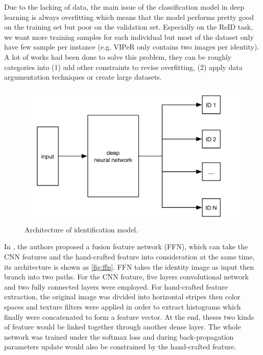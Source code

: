 Due to the lacking of data, the main issue of the classification model in deep
learning is always overfitting which means that the model performs pretty good on the
training set but poor on the validation set. Especially on the ReID task, we want more
training samples for each individual but most of the dataset only have few sample
per instance (e.g. VIPeR only contains two images per identity). A lot of works had
been done to solve this problem, they can be roughly categories into
(1) add other constraints to revise overfitting,
(2) apply data argumentation techniques or create large datasets.

\begin{figure}
    \begin{center}
    \includegraphics[scale=0.8]{figures/id_model.png}
    \end{center}
    \caption{Architecture of identification model.}
    \label{fig:id-model}
\end{figure}

In \cite{feature-fusion-net-2016}, the authors proposed a fusion feature
network (FFN), which can take the CNN features and the hand-crafted feature into
consideration at the same time, its architecture is shown as
\autoref{fig:ffn}. FFN takes the identity image as input then branch into two
paths. For the CNN feature, five layers convolutional network and two fully connected layers
were employed. For hand-crafted feature extraction, the original image was divided into horizontal
stripes then color spaces and texture filters were applied in order
to extract histograms which finally were concatenated to form a feature vector. At the end,
theses two kinds of feature would be linked together through another dense layer. The whole
network was trained under the softmax loss and during back-propagation parameters update would
also be constrained by the hand-crafted feature.

